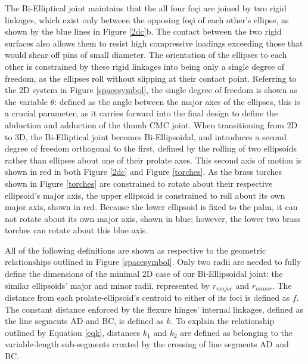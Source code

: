 \documentclass[journal]{IEEEtran}
\begin{document}
The Bi-Elliptical joint maintains that the all four foçi are joined by two rigid linkages, which exist only between the opposing foçi of each other's ellipse, as shown by the blue lines in Figure \ref{2dc}b. The contact between the two rigid surfaces also allows them to resist high compressive loadings exceeding those that would shear off pins of small diameter. The orientation of the ellipses to each other is constrained by these rigid linkages into being only a single degree of freedom, as the ellipses roll without slipping at their contact point. Referring to the 2D system in Figure \ref{spacesymbol}, the single degree of freedom is shown as the variable \(\theta{}\): defined as the angle between the major axes of the ellipses, this is a crucial parameter, as it carries forward into the final design to define the abduction and adduction of the thumb CMC joint. When transitioning from 2D to 3D, the Bi-Elliptical joint becomes Bi-Ellipsoidal, and introduces a second degree of freedom orthogonal to the first, defined by the rolling of two ellipsoids rather than ellipses about one of their prolate axes. This second axis of motion is shown in red in both Figure \ref{2dc} and Figure \ref{torches}. As the brass torches shown in Figure \ref{torches} are constrained to rotate about their respective ellipsoid's major axis, the upper ellipsoid is constrained to roll about its own major axis, shown in red. Because the lower ellipsoid is fixed to the palm, it can not rotate about its own major axis, shown in blue; however, the lower two brass torches can rotate about this blue axis. 

All of the following definitions are shown as respective to the geometric relationships outlined in Figure \ref{spacesymbol}. Only two radii are needed to fully define the dimensions of the minimal 2D case of our Bi-Ellipsoidal joint: the similar ellipsoids' major and minor radii, represented by $r_{major}$ and $r_{minor}$. The distance from each prolate-ellipsoid's centroid to either of its foci is defined as $f$. The constant distance enforced by the flexure hinges' internal linkages, defined as the line segments AD and BC, is defined as $k$. To explain the relationship outlined by Equation \ref{eqk}, distances $k_1$ and $k_2$ are defined as belonging to the variable-length sub-segments created by the crossing of line segments AD and BC. 

\end{document}

